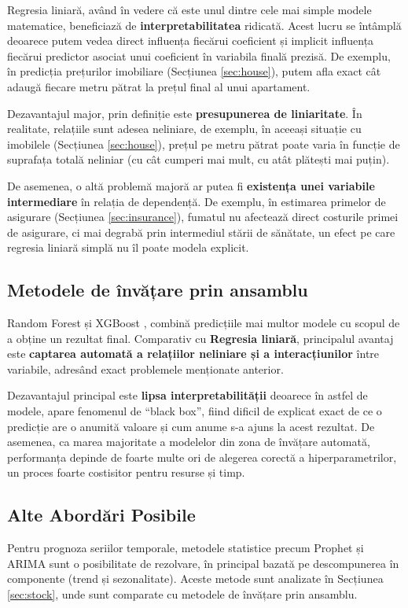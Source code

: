 \documentclass[a4paper,12pt]{article}
\begin{document}
Regresia liniară, având în vedere că este unul dintre cele mai simple modele matematice, beneficiază de \textbf{interpretabilitatea} ridicată. Acest lucru se întâmplă deoarece putem vedea direct influența fiecărui coeficient și implicit influența fiecărui predictor asociat unui coeficient în variabila finală prezisă. De exemplu, în predicția prețurilor imobiliare (Secțiunea \ref{sec:house}), putem afla exact cât adaugă fiecare metru pătrat la prețul final al unui apartament.

Dezavantajul major, prin definiție este \textbf{presupunerea de liniaritate}. În realitate, relațiile sunt adesea neliniare, de exemplu, în aceeași situație cu imobilele (Secțiunea \ref{sec:house}), prețul pe metru pătrat poate varia în funcție de suprafața totală neliniar (cu cât cumperi mai mult, cu atât plătești mai puțin). 

De asemenea, o altă problemă majoră ar putea fi \textbf{existența unei variabile intermediare} în relația de dependență. De exemplu, în estimarea primelor de asigurare (Secțiunea \ref{sec:insurance}), fumatul nu afectează direct costurile primei de asigurare, ci mai degrabă prin intermediul stării de sănătate, un efect pe care regresia liniară simplă nu îl poate modela explicit.

\subsection{Metodele de învățare prin ansamblu}
Random Forest \cite{breiman2001random} și XGBoost \cite{chen2016xgboost}, combină predicțiile mai multor modele cu scopul de a obține un rezultat final. Comparativ cu \textbf{Regresia liniară}, principalul avantaj este \textbf{captarea automată a relațiilor neliniare și a interacțiunilor} între variabile, adresând exact problemele menționate anterior.

Dezavantajul principal este \textbf{lipsa interpretabilității} deoarece în astfel de modele, apare fenomenul de ``black box'', fiind dificil de explicat exact de ce o predicție are o anumită valoare și cum anume s-a ajuns la acest rezultat. De asemenea, ca marea majoritate a modelelor din zona de învățare automată, performanța depinde de foarte multe ori de alegerea corectă a hiperparametrilor, un proces foarte costisitor pentru resurse și timp.

\subsection{Alte Abordări Posibile}
Pentru prognoza seriilor temporale, metodele statistice precum Prophet \cite{taylor2018prophet} și ARIMA sunt o posibilitate de rezolvare, în principal bazată pe descompunerea în componente (trend și sezonalitate). Aceste metode sunt analizate în Secțiunea \ref{sec:stock}, unde sunt comparate cu metodele de învățare prin ansamblu.
\end{document}
